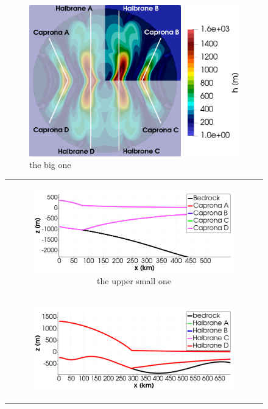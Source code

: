 \documentclass{article}
\begin{document}
\begin{figure}[!h]
  \begin{subfigure}[c]{.52\linewidth}
    \centering
    \includegraphics[width=\linewidth]{../fig/Profiles_Thule_combined_domains_2_con_fondo.png}%
    \caption
      {%
        the big one%
        \label{fig:big}%
      }%
  \end{subfigure}\hfill
  \begin{tabular}[c]{@{}c@{}}
    \begin{subfigure}[c]{.48\linewidth}
      \centering
      \includegraphics[width=\linewidth]{../fig/Capronas_Thule_Domain_con_fondo.png}%
      \caption
        {%
          the upper small one%
          \label{fig:upper}%
        }%
    \end{subfigure}\\
    \noalign{\bigskip}%
    \begin{subfigure}[c]{.48\linewidth}
      \centering
      \includegraphics[width=\linewidth,page=2]{../fig/Halbranes_thule_domain_con_fondo.png}%

\end{subfigure}
\end{tabular}
\end{figure}
\end{document}
